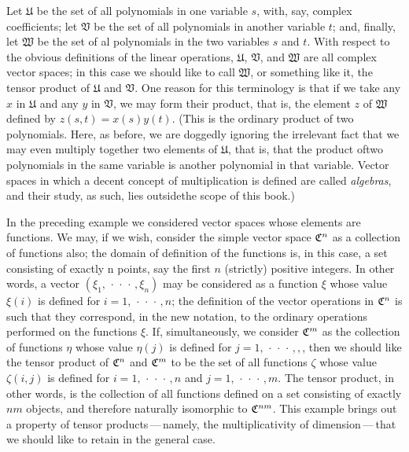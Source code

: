 Let \(\mathfrak{U}\) be the set of all polynomials in one variable \(s\), with,
say, complex coefficients; let \(\mathfrak{V}\) be the set of all polynomials in
another variable \(t\); and, finally, let \(\mathfrak{W}\) be the set of al
polynomials in the two variables \(s\) and \(t\). With respect to the obvious
definitions of the linear operations, \(\mathfrak{U}\), \(\mathfrak{V}\), and
\(\mathfrak{W}\) are all complex vector spaces; in this case we should like to
call \(\mathfrak{W}\), or something like it, the tensor product of
\(\mathfrak{U}\) and \(\mathfrak{V}\). One reason for this terminology is that
if we take any \(x\) in \(\mathfrak{U}\) and any \(y\) in \(\mathfrak{V}\), we
may form their product, that is, the element \(z\) of \(\mathfrak{W}\) defined
by \(z(s, t) = x(s) y(t)\). (This is the ordinary product of two polynomials.
Here, as before, we are doggedly ignoring the irrelevant fact that we may even
multiply together two elements of \(\mathfrak{U}\), that is, that the product
oftwo polynomials in the same variable is another polynomial in that variable.
Vector spaces in which a decent concept of multiplication is defined are called
\emph{algebras}, and their study, as such, lies outsidethe scope of this book.)

In the preceding example we considered vector spaces whose elements are
functions. We may, if we wish, consider the simple vector space \(\mathfrak{C}^n\)
as a collection of functions also; the domain of definition of the functions is,
in this case, a set consisting of exactly n points, say the first \(n\)
(strictly) positive integers. In other words, a vector \((\xi_1,
\,\cdot\,\cdot\,\cdot\,, \xi_n)\)  may be considered as a function \(\xi\) whose
value \(\xi(i)\) is defined for \(i = 1, \,\cdot\,\cdot\,\cdot\,, n\); the
definition of the vector operations in \(\mathfrak{C}^n\) is such that they
correspond, in the new notation, to the ordinary operations performed on the
functions \(\xi\). If, simultaneously, we consider \(\mathfrak{C}^m\) as the
collection of functions \(\eta\) whose value \(\eta(j)\) is defined for \(j = 1,
\,\cdot\,\cdot\,\cdot\,, ,\), then we should like the tensor product of
\(\mathfrak{C}^n\) and \(\mathfrak{C}^m\) to be the set of all functions \(\zeta\) whose
value \(\zeta(i, j)\) is defined for \(i = 1, \,\cdot\,\cdot\,\cdot\,, n\) and
\(j = 1, \,\cdot\,\cdot\,\cdot\,, m\). The tensor product, in other words, is
the collection of all functions defined on a set consisting of exactly \(nm\)
objects, and therefore naturally isomorphic to \(\mathfrak{C}^{nm}\). This example
brings out a property of tensor products\,---\,namely, the multiplicativity of
dimension\,---\,that we should like to retain in the general case.

